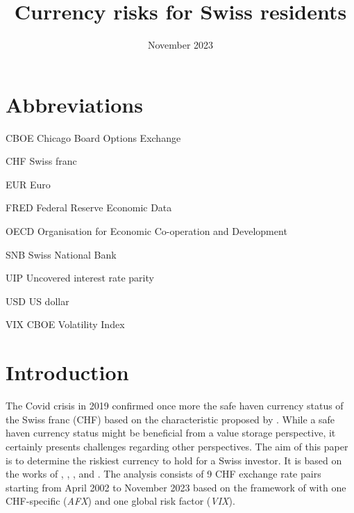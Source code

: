 \documentclass[a4paper,11pt,oneside]{article}
\title{Currency risks for Swiss residents}
\date{November 2023}
\newcommand{\abbrlabel}[1]{\makebox[1in][l]{\textbf{#1}\ }}
\newenvironment{Abbreviations}{\begin{list}{}{\renewcommand{\makelabel}{\abbrlabel}}}{\end{list}}
\begin{document}
\maketitle

\newpage
\pagestyle{plain}
\setcounter{page}{1}
\tableofcontents

\newpage
\pagestyle{plain}
\listoffigures
{}

\newpage
\begingroup
\vspace{4ex}
\let\clearpage\relax
\listoftables
\endgroup
{}

\newpage
\pagestyle{plain}
\section*{Abbreviations}
\begin{Abbreviations}
\item[CBOE] Chicago Board Options Exchange 
\item[CHF] Swiss franc
\item[EUR] Euro
\item[FRED] Federal Reserve Economic Data 
\item[OECD] Organisation for Economic Co-operation and Development
\item[SNB] Swiss National Bank
\item[UIP] Uncovered interest rate parity
\item[USD] US dollar
\item[VIX] CBOE Volatility Index
\end{Abbreviations}


\newpage
\pagestyle{fancy}
\setcounter{page}{1}

\section{Introduction}\label{Introduction}
The Covid crisis in 2019 confirmed once more the safe haven currency status of the Swiss franc (CHF) based on the characteristic proposed by \cite{Habib and Stracca 2012}. While a safe haven currency status might be beneficial from a value storage perspective, it certainly presents challenges regarding other perspectives. The aim of this paper is to determine the riskiest currency to hold for a Swiss investor. It is based on the works of \cite{Grisse and Nitschka 2015}, \cite{Verdelhan 2010}, \cite{Backus and Foresi and Telmer 2001}, and \cite{Lustig and Roussanov and Verdelhan 2011}. The analysis consists of 9 CHF exchange rate pairs starting from April 2002 to November 2023 based on the framework of \cite{Grisse and Nitschka 2015} with one CHF-specific (\emph{AFX}) and one global risk factor (\emph{VIX}).\par
\end{document}
